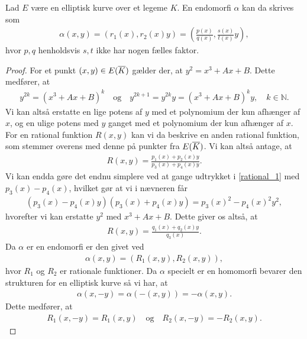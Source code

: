 \begin{thm}
\label{end_rep_theorem}
Lad $E$ være en elliptisk kurve over et legeme $K$. En endomorfi $\alpha$ kan da skrives som
\begin{align*}
	\alpha(x, y) = (r_1(x), r_2(x)y) = \left( \frac{p(x)}{q(x)}, \frac{s(x)}{t(x)}y \right),
\end{align*}
hvor $p, q$ henholdsvis $s, t$ ikke har nogen fælles faktor.
\end{thm}
\begin{proof}
For et punkt $(x, y) \in E(\overline{K})$ gælder der, at $y^2 = x^3 + Ax + B$. Dette medfører, at  
\begin{align*}
	y^{2k} = (x^3 + Ax + B)^k \quad \text{og} \quad y^{2k+1}= y^{2k}y = (x^3 + Ax + B)^k y, \quad k \in \mathbb{N}.
\end{align*}
Vi kan altså erstatte en lige potens af $y$ med et polynomium der kun afhænger af $x$, og en ulige potens med $y$ ganget med et polynomium der kun afhænger af $x$. For en rational funktion $R(x, y)$ kan vi da beskrive en anden rational funktion, som stemmer overens med denne på punkter fra $E(\overline{K})$. Vi kan altså antage, at
\begin{align}
	\label{rational_1}
	R(x, y) = \frac{p_1(x) + p_2(x)y}{p_3(x)+p_4(x)y}.
\end{align}
Vi kan endda gøre det endnu simplere ved at gange udtrykket i \eqref{rational_1} med $p_3(x)-p_4(x)$, hvilket gør at vi i nævneren får
\begin{align*}
	(p_3(x) - p_4(x)y)(p_3(x)+p_4(x)y) = p_3(x)^2 - p_4(x)^2 y^2,
\end{align*}
hvorefter vi kan erstatte $y^2$ med $x^3 + Ax + B$. Dette giver os altså, at 
\begin{align}
	\label{rational_final}
	R(x, y) = \frac{q_1(x) + q_2(x)y}{q_3(x)}.
\end{align}
Da $\alpha$ er en endomorfi er den givet ved
\begin{align*}
	\alpha(x, y) = (R_1(x, y), R_2(x, y)),
\end{align*}
hvor $R_1$ og $R_2$ er rationale funktioner. Da $\alpha$ specielt er en homomorfi bevarer den strukturen for en elliptisk kurve så vi har, at
\begin{align*}
	\alpha(x, -y) = \alpha(-(x, y)) =  -\alpha(x, y).
\end{align*}
Dette medfører, at 
\begin{align*}
	R_1(x, -y) = R_1(x, y) \quad \text{og} \quad R_2(x, -y) = -R_2(x, y).
\end{align*}

\end{proof}
